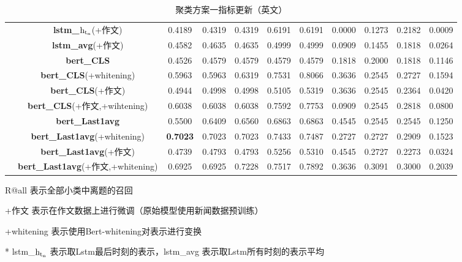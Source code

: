 \documentclass[11pt]{article}
\begin{document}
\begin{CJK}{UTF8}{gkai}
\begin{table}[hp]
{\begin{tabular}{c|c|ccccccccc}
      & \textbf{lstm\_$\rm h_{t_n}$}(+作文) & 0.4189  & 0.4319  & 0.4319  & 0.6191  & 0.6191  & 0.0000  & 0.1273  & 0.2182  & 0.0009  \\
      & \textbf{lstm\_avg}(+作文) & 0.4582  & 0.4635  & 0.4635  & 0.4999  & 0.4999  & 0.0909  & 0.1455  & 0.1818  & 0.0264  \\
      \cline{2-11}
      & \textbf{bert\_CLS} & 0.4526  & 0.4579  & 0.4579  & 0.4579  & 0.4579  & 0.1818  & 0.2000  & 0.1818  & 0.1146  \\
      & \textbf{bert\_CLS}(+whitening) & 0.5963  & 0.5963  & 0.6319  & 0.7531  & 0.8066  & 0.3636  & 0.2545  & 0.2727  & 0.1594  \\
      & \textbf{bert\_CLS}(+作文) & 0.4944  & 0.4998  & 0.4998  & 0.5105  & 0.5319  & 0.3636  & 0.2545  & 0.2364  & 0.0420  \\
      & \textbf{bert\_CLS}(+作文,+wihtening) & 0.6038  & 0.6038  & 0.6038  & 0.7592  & 0.7753  & 0.0909  & 0.2545  & 0.2818  & 0.0800  \\
      \cline{2-11}
      & \textbf{bert\_Last1avg} & 0.5500  & 0.6409  & 0.6560  & 0.6863  & 0.6863  & 0.4545  & 0.2545  & 0.2545  & 0.1250  \\
      & \textbf{bert\_Last1avg}(+whitening) & \textcolor[rgb]{ 1,  0,  0}{\textbf{0.7023 }} & 0.7023  & 0.7023  & 0.7433  & 0.7487  & 0.2727  & 0.2727  & 0.2909  & 0.1523  \\
      & \textbf{bert\_Last1avg}(+作文) & 0.4739  & 0.4793  & 0.4793  & 0.5256  & 0.5310  & 0.4545  & 0.2727  & 0.2273  & 0.0324  \\
      & \textbf{bert\_Last1avg}(+作文,+whitening) & 0.6925  & 0.6925  & 0.7228  & 0.7517  & 0.7892  & 0.3636  & 0.3091  & 0.3000  & 0.2039  \\
      \hline
    \end{tabular}%
  }
  \begin{tablenotes}    %
    \footnotesize               %
    \item[1] R@all 表示全部小类中离题的召回
    \item[2] +作文 表示在作文数据上进行微调（原始模型使用新闻数据预训练） 
    \item[3] +whitening 表示使用Bert-whitening对表示进行变换
    \item[4] * lstm\_$\rm h_{t_n}$ 表示取Lstm最后时刻的表示，lstm\_avg 表示取Lstm所有时刻的表示平均 
  \end{tablenotes} 
  \caption{聚类方案一指标更新（英文）}
  \label{tab:addlabel}%
\end{table}%


\end{CJK}
\end{document}
